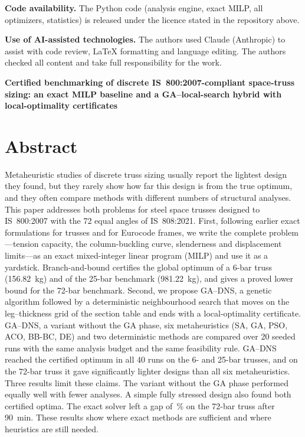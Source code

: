 \documentclass[lineno,pdflatex,sn-mathphys-num]{sn-jnl}
\begin{document}
\begin{titlepage}
\vspace{0.45em}
\noindent\textbf{Code availability.} The Python code (analysis engine, exact MILP, all optimizers, statistics) is released under the licence stated in the repository above.

\vspace{0.45em}
\noindent\textbf{Use of AI-assisted technologies.} The authors used Claude (Anthropic) to assist with code review, \LaTeX{} formatting and language editing. The authors checked all content and take full responsibility for the work.
\end{titlepage}
\clearpage
\setcounter{page}{1}

\begin{center}
{\LARGE\bfseries Certified benchmarking of discrete IS~800:2007-compliant space-truss sizing: an exact MILP baseline and a GA--local-search hybrid with local-optimality certificates}
\end{center}

\section*{Abstract}
Metaheuristic studies of discrete truss sizing usually report the lightest
design they found, but they rarely show how far this design is from the true
optimum, and they often compare methods with different numbers of structural
analyses. This paper addresses both problems for steel space trusses designed to
IS~800:2007 with the 72 equal angles of IS~808:2021. First, following earlier
exact formulations for trusses and for Eurocode frames, we write the complete
problem---tension capacity, the column-buckling curve, slenderness and
displacement limits---as an exact mixed-integer linear program (MILP) and use
it as a yardstick. Branch-and-bound certifies the global optimum of a 6-bar
truss (156.82~kg) and of the 25-bar benchmark (981.22~kg), and gives a proved
lower bound for the 72-bar benchmark. Second, we propose GA--DNS, a genetic
algorithm followed by a deterministic neighbourhood search that moves on the
leg--thickness grid of the section table and ends with a local-optimality
certificate. GA--DNS, a variant without the GA phase, six metaheuristics (SA,
GA, PSO, ACO, BB-BC, DE) and two deterministic methods are compared over 20
seeded runs with the same analysis budget and the same feasibility rule.
GA--DNS reached the certified optimum in all 40 runs on the 6- and 25-bar
trusses, and on the 72-bar truss it gave significantly lighter designs than
all six metaheuristics. Three results limit these claims. The variant
without the GA phase performed equally well with fewer analyses. A simple fully
stressed design also found both certified optima. The exact solver left a gap
of \GAPsvt\,\% on the 72-bar truss after 90~min. These results show where
exact methods are sufficient and where heuristics are still needed.
\end{document}
